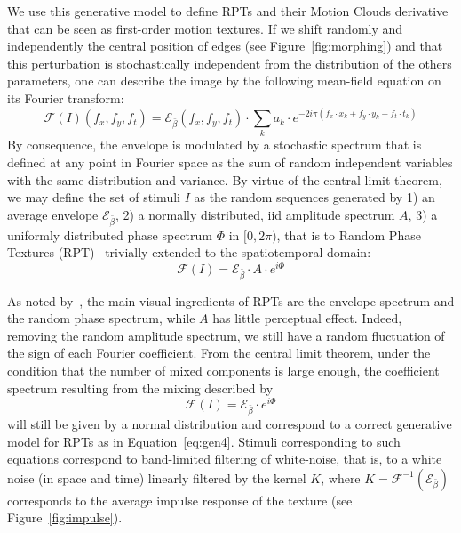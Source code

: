 \documentclass[a4paper,11pt]{article}%
\begin{document}
We use this generative model to define RPTs and their Motion Clouds derivative that can be seen as first-order motion textures. If we shift randomly and independently the central position of edges (see Figure~\ref{fig:morphing}) and that this perturbation is stochastically independent from the distribution of the others parameters, one can describe the image by the following mean-field equation on its Fourier transform:
\begin{equation}%
\mathcal{F}(I)(f_x, f_y, f_t) = \mathcal{E}_{\bar{\beta}}(f_x, f_y, f_t) \cdot \sum_k a_k \cdot e^{-2i\pi (f_x \cdot x_k + f_y \cdot y_k + f_t \cdot t_k)} \label{eq:gen3}%
\end{equation}%
By consequence, the envelope is modulated by a stochastic spectrum that is defined at any point in Fourier space as the sum of random independent variables with the same distribution and variance. By virtue of the central limit theorem, we may define the set of stimuli $I$ as the random sequences generated by 1) an average envelope $\mathcal{E}_{\bar{\beta}}$, 2) a normally distributed, iid amplitude spectrum $A$, 3) a uniformly distributed phase spectrum $\Phi$ in $[0, 2\pi )$, that is to Random Phase Textures (RPT)~\citep{Galerne10} trivially extended to the spatiotemporal domain:
\begin{equation}%
\mathcal{F}(I) = \mathcal{E}_{\bar{\beta}} \cdot A \cdot e^{i\Phi} \label{eq:gen4}%
\end{equation}%

As noted by~\citep{Galerne10}, the main visual ingredients of RPTs are the envelope spectrum and the random phase spectrum, while $A$ has little perceptual effect. Indeed, removing the random amplitude spectrum, we still have a random fluctuation of the sign of each Fourier coefficient. From the central limit theorem, under the condition that the number of mixed components is large enough, the coefficient spectrum resulting from the mixing described by
\begin{equation}%
\mathcal{F}(I) = \mathcal{E}_{\bar{\beta}} \cdot e^{i\Phi} \label{eq:gen5}%
\end{equation}%
will still be given by a normal distribution and correspond to a correct generative model for RPTs as in Equation~\ref{eq:gen4}. Stimuli corresponding to such equations correspond to band-limited filtering of white-noise, that is, to a white noise (in space and time) linearly filtered by the kernel $K$, where $K=\mathcal{F}^{-1}(\mathcal{E}_{\bar{\beta}})$ corresponds to the average impulse response of the texture (see Figure~\ref{fig:impulse}). %
\end{document}
